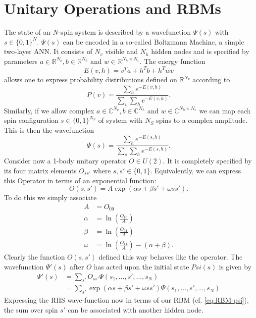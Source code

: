\documentclass{article}
\begin{document}
%
%
\section{Unitary Operations and RBMs}
%
The state of an $N$-spin system is described by a wavefunction $\Psi(s)$ with
$s\in\{0,1\}^N$. $\Psi(s)$ can be encoded in a so-called Boltzmann Machine, a
simple two-layer ANN. It consists of $N_v$ visible and $N_h$ hidden nodes and
is specified by parameters $a\in\mathbb{R}^{N_v}, b\in\mathbb{R}^{N_h}$ and
$w\in\mathbb{R}^{N_h\times N_v}$. The energy function
\begin{equation}
    E(v,h) = v^Ta + h^Tb + h^Twv
\end{equation}
allows one to express probability distributions defined on $\mathbb{R}^{N_v}$
according to
\begin{equation}
    P(v) = \frac{\sum_{h}e^{-E(v,h)}}{\sum_v \sum_h e^{-E(v,h)}}.
\end{equation}
Similarly, if we allow complex $a\in\mathbb{C}^{N_v}, b\in\mathbb{C}^{N_h}$ and
$w\in\mathbb{C}^{N_h\times N_v}$ we can map each spin configuration
$s\in\{0,1\}^{N_S}$ of system with $N_S$ spins to a complex amplitude. This is
then the wavefunction
\begin{equation}
    \Psi(s) = \frac{\sum_{h}e^{-E(s,h)}}{\sum_s \sum_h e^{-E(s,h)}}.
    \label{eq:RBM-psi}
\end{equation}
Consider now a 1-body unitary operator $O\in U(2)$. It is completely specified
by its four matrix elements $O_{ss'}$ where $s,s'\in\{0,1\}$. Equivalently, we
can express this Operator in terms of an exponential function:
\begin{equation}
    O(s, s') = A \exp{(\alpha s + \beta s' +  \omega ss')}.
\end{equation}
To do this we simply associate
\begin{align*}
    A &= O_{00} \\
    \alpha &= \ln{\left(\frac{O_{10}}{A}\right)} \\
    \beta &= \ln{\left(\frac{O_{01}}{A}\right)} \\
    \omega &= \ln{\left(\frac{O_{11}}{A}\right)} - (\alpha + \beta).
\end{align*}
Clearly the function $O(s,s')$ defined this way behaves like the operator. The
wavefunction $\Psi'(s)$ after $O$ has acted upon the initial state $Psi(s)$ is
given by
\begin{align}
    \Psi'(s) &= \sum_{s'} O_{ss'} \Psi(s_1,\hdots, s', \hdots, s_N) \nonumber \\
             &= \sum_{s'} \exp{(\alpha s + \beta s' +  \omega ss')} \Psi(s_1,
                \hdots, s', \hdots, s_N)
\end{align}
Expressing the RHS wave-function now in terms of our RBM (cf. \ref{eq:RBM-psi}),
the sum over spin $s'$ can be associated with another hidden node.
%
%
%
\end{document}
